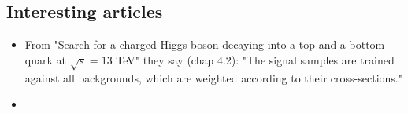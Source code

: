 \documentclass[12pt, a4paper]{book}
\begin{document}
\subsection*{Interesting articles}
\begin{itemize}
	\item From "Search for a charged Higgs boson decaying into a top and a bottom quark at $\sqrt{s} = 13$ TeV" \cite{Benchekroun_2710015} they say (chap 4.2): "The signal samples are trained against all backgrounds, which are weighted according to their
	cross-sections."
	\item 
\end{itemize}


\clearpage
{}
{}
\printbibliography
\end{document}
